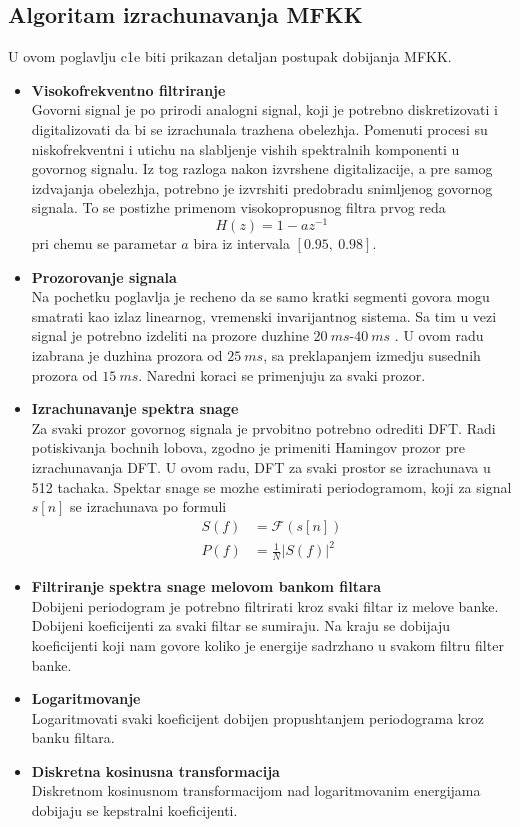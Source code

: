 \documentclass[a4paper, openany, oneside, 11pt]{book}
\begin{document}
\subsection{Algoritam izrachunavanja \acrshort{MFKK}}
U ovom poglavlju c1e biti prikazan detaljan postupak dobijanja \acrshort{MFKK}.
\begin{itemize}
\item \textbf{Visokofrekventno filtriranje}\\
Govorni signal je po prirodi analogni signal, koji je potrebno diskretizovati i digitalizovati da bi se izrachunala trazhena obelezhja. Pomenuti procesi su niskofrekventni i utichu na slabljenje vishih spektralnih komponenti u govornog signalu. Iz tog razloga nakon izvrshene digitalizacije, a pre samog izdvajanja obelezhja, potrebno je izvrshiti predobradu snimljenog govornog signala. To se postizhe primenom visokopropusnog filtra prvog reda
\begin{equation}
H(z) = 1-az^{-1}
\end{equation}
pri chemu se parametar $a$ bira iz intervala $[0.95,\ 0.98] $\cite{kepstrum}.
\item \textbf{Prozorovanje signala}\\
Na pochetku poglavlja je recheno da se samo kratki segmenti govora mogu smatrati kao izlaz linearnog, vremenski invarijantnog sistema. Sa tim u vezi signal je potrebno izdeliti na prozore duzhine $\SI{20}{ms}$-$\SI{40}{ms}$  \cite{OPGpredavanja}. U ovom radu izabrana je duzhina prozora od $\SI{25}{ms}$, sa preklapanjem izmedju susednih prozora od $\SI{15}{ms}$. Naredni koraci se primenjuju za svaki prozor.
\item \textbf{Izrachunavanje spektra snage}\\
Za svaki prozor govornog signala je prvobitno potrebno odrediti \acrshort{DFT}. Radi potiskivanja bochnih lobova, zgodno je primeniti Hamingov prozor pre izrachunavanja \acrshort{DFT}. U ovom radu, \acrshort{DFT} za svaki prostor se izrachunava u 512 tachaka. Spektar snage se mozhe estimirati periodogramom, koji za signal $s[n]$ se izrachunava po formuli
\begin{align}
S(f) &=\boldsymbol{\mathcal{F}}(s[n])\\
P(f) &=\frac{1}{N}|S(f)|^2
\end{align}
\item \textbf{Filtriranje spektra snage melovom bankom filtara}\\
Dobijeni periodogram je potrebno filtrirati kroz svaki filtar iz melove banke. Dobijeni koeficijenti za svaki filtar se sumiraju. Na kraju se dobijaju koeficijenti koji nam govore koliko je energije sadrzhano u svakom filtru filter banke.
\item \textbf{Logaritmovanje}\\
Logaritmovati svaki koeficijent dobijen propushtanjem periodograma kroz banku filtara.
\item \textbf{Diskretna kosinusna transformacija}\\
Diskretnom kosinusnom transformacijom nad logaritmovanim energijama dobijaju se kepstralni koeficijenti.
\end{itemize}
\end{document}
